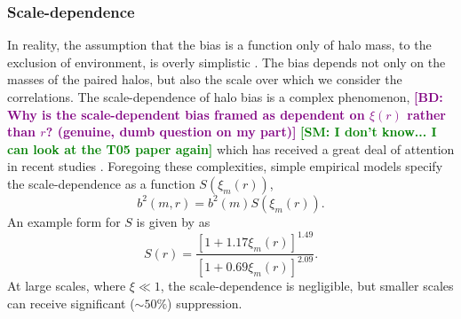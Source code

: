 \documentclass[5p]{elsarticle}
\newcommand{\bd}[1]{\textcolor{purple}{\textbf{[BD: #1]}}}
\newcommand{\sgm}[1]{\textcolor{green}{\textbf{[SM: #1]}}}
\begin{document}
\subsubsection{Scale-dependence}
\label{sec:theory:bias:sd}
In reality, the assumption that the bias is a function only of halo mass, to the exclusion of environment, is overly simplistic \citep{Sunayama2015}. 
The bias depends not only on the masses of the paired halos, but also the scale over which we consider the correlations. 
The scale-dependence of halo bias is a complex phenomenon, \bd{Why is the scale-dependent bias framed as dependent on $\xi(r)$ rather than $r$? (genuine, dumb question on my part)} \sgm{I don't know... I can look at the T05 paper again} which has received a great deal of attention in recent studies \citep[eg.][]{Paranjape2013,Lapi2014,Poole2015}. Foregoing these complexities, simple empirical models specify the scale-dependence as a function $S(\xi_m(r))$,
\begin{equation}
    b^2(m,r) = b^2(m) S(\xi_m(r)).
\end{equation}
An example form for $S$ is given by \citet{Tinker2005} as
\begin{equation}
	\label{eq:sdb}
	S(r) = \frac{\left[1+1.17\xi_m(r)\right]^{1.49}}{\left[1+0.69\xi_m(r)\right]^{2.09}}.
\end{equation}
At large scales, where $\xi \ll 1$, the scale-dependence is negligible, but smaller scales can receive significant ($\sim 50\%$) suppression. 


\end{document}
